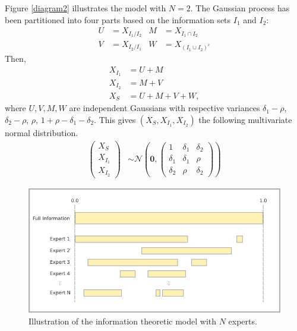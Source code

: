 \documentclass[11pt,twoside]{article}
\begin{document}
Figure \ref{diagram2} illustrates the model with $N=2$. The Gaussian process has been partitioned into four parts based on the information sets $I_1$ and $I_2$:
\begin{align*}
 U &= X_{I_1 / I_2}
& M &= X_{I_1 \cap I_2}\\
 V &= X_{I_2 / I_1}
& W &= X_{(I_1 \cup I_2)^c}
\end{align*}
Then,
\begin{align*}
X_{I_1} &= U + M\\
X_{I_2} &= M + V\\
X_S &= U+M+V+W,
\end{align*}
where $U, V, M, W$ are independent Gaussians with respective variances $\delta_1-\rho$, $\delta_2-\rho$, $\rho$, $1+\rho-\delta_1 - \delta_2$. This gives $(X_{S}, X_{I_1}, X_{I_2})$ the following multivariate normal distribution. 
\begin{align}
\left(\begin{matrix} X_S \\ X_{I_1}\\ X_{I_2} \end{matrix}\right) &\sim \mathcal{N}\left(
 \boldsymbol{0},  \left(\begin{matrix} 
1 & \delta_1 & \delta_2\\
\delta_1 & \delta_1 &\rho\\
\delta_2 & \rho & \delta_2
 \end{matrix}\right)\right) \label{twoExperts}
\end{align}

\begin{figure}[htbp]
   \includegraphics[width = \textwidth]{N=N} %
   \caption{Illustration of the information theoretic  model with $N$ experts.}
   \label{diagramN}
\end{figure}
\end{document}

